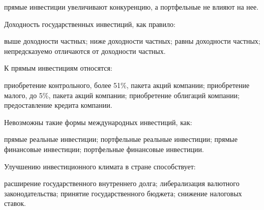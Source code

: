 \documentclass[12pt, table]{exam}
\begin{document}
\begin{questions}
\begin{multicols}{2}
\begin{choices}
	 \choice прямые инвестиции увеличивают конкуренцию, а портфельные не влияют на нее.
	 \end{choices}
\question  Доходность государственных инвестиций, как правило:
	 \begin{choices}
	 \choice выше доходности частных;
	 \choice ниже доходности частных;
	 \CC равны доходности частных;
	 \choice непредсказуемо отличаются от доходности частных.
	 \end{choices}
\question  К прямым инвестициям относятся:
	 \begin{choices}
	 \CC приобретение контрольного, более 51\%, пакета акций компании;
	 \choice приобретение малого, до 5\%, пакета акций компании;
	 \choice приобретение облигаций компании;
	 \choice предоставление кредита компании.
	 \end{choices}
\question  Невозможны такие формы международных инвестиций, как:
	 \begin{choices}
	 \choice прямые реальные инвестиции;
	 \choice портфельные реальные инвестиции;
	 \choice прямые финансовые инвестиции;
	 \CC портфельные финансовые инвестиции.
	 \end{choices}
\question  Улучшению инвестиционного климата в стране способствует:
	 \begin{choices}
	 \choice расширение государственного внутреннего долга;
	 \choice либерализация валютного законодательства;
	 \CC принятие государственного бюджета;
	 \choice снижение налоговых ставок.
	 \end{choices}



\end{multicols}
\end{questions}
\end{document}
